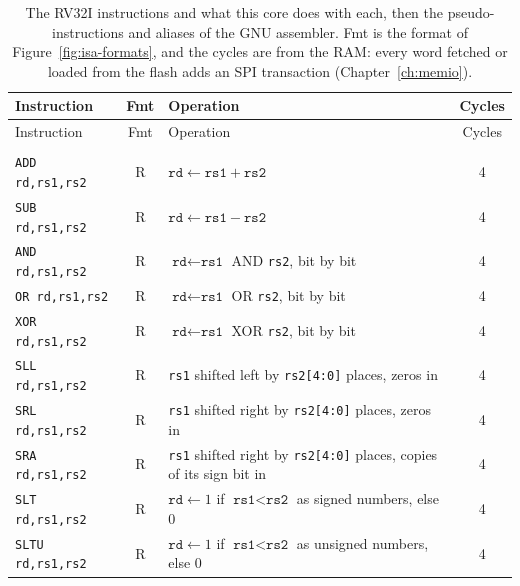 \documentclass[11pt,a4paper]{report}
\begin{document}
\begin{footnotesize}
\renewcommand{\arraystretch}{1.05}%
\begin{longtable}{@{}>{\raggedright\arraybackslash}p{3.3cm}c
    >{\raggedright\arraybackslash}p{8.4cm}c@{}}
  \caption{The RV32I instructions and what this core does with each, then the
    pseudo-instructions and aliases of the GNU assembler. Fmt is the format of
    Figure~\ref{fig:isa-formats}, and the cycles are from the RAM: every word fetched or
    loaded from the flash adds an SPI transaction (Chapter~\ref{ch:memio}).}
  \label{tab:isa} \\
  \toprule
  Instruction & Fmt & Operation & Cycles \\
  \midrule
  \endfirsthead
  \toprule
  Instruction & Fmt & Operation & Cycles \\
  \midrule
  \endhead
  \bottomrule
  \endfoot
  \multicolumn{4}{@{}l}{\emph{Register and register}} \\*
  \texttt{ADD rd,rs1,rs2} & R & $\texttt{rd} \leftarrow \texttt{rs1} + \texttt{rs2}$ & 4 \\
  \texttt{SUB rd,rs1,rs2} & R & $\texttt{rd} \leftarrow \texttt{rs1} - \texttt{rs2}$ & 4 \\
  \texttt{AND rd,rs1,rs2} & R & $\texttt{rd} \leftarrow \texttt{rs1}$ AND \texttt{rs2}, bit
    by bit & 4 \\
  \texttt{OR rd,rs1,rs2} & R & $\texttt{rd} \leftarrow \texttt{rs1}$ OR \texttt{rs2}, bit by
    bit & 4 \\
  \texttt{XOR rd,rs1,rs2} & R & $\texttt{rd} \leftarrow \texttt{rs1}$ XOR \texttt{rs2}, bit
    by bit & 4 \\
  \texttt{SLL rd,rs1,rs2} & R & \texttt{rs1} shifted left by \texttt{rs2[4:0]} places, zeros
    in & 4 \\
  \texttt{SRL rd,rs1,rs2} & R & \texttt{rs1} shifted right by \texttt{rs2[4:0]} places, zeros
    in & 4 \\
  \texttt{SRA rd,rs1,rs2} & R & \texttt{rs1} shifted right by \texttt{rs2[4:0]} places,
    copies of its sign bit in & 4 \\
  \texttt{SLT rd,rs1,rs2} & R & $\texttt{rd} \leftarrow 1$ if $\texttt{rs1} < \texttt{rs2}$
    as signed numbers, else 0 & 4 \\
  \texttt{SLTU rd,rs1,rs2} & R & $\texttt{rd} \leftarrow 1$ if $\texttt{rs1} < \texttt{rs2}$
    as unsigned numbers, else 0 & 4 \\

\end{longtable}
\end{footnotesize}
\end{document}
